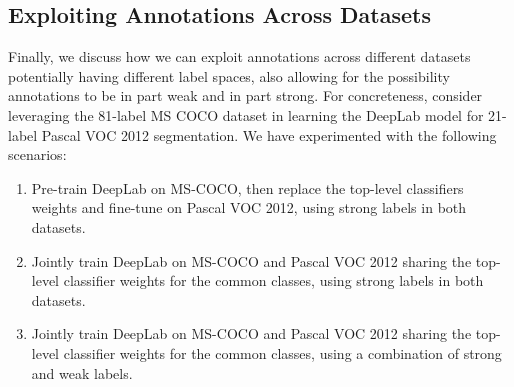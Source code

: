 \subsection{Exploiting Annotations Across Datasets}

Finally, we discuss how we can exploit annotations across different
datasets potentially having different label spaces, also allowing for
the possibility annotations to be in part weak and in part strong. For
concreteness, consider leveraging the 81-label MS COCO dataset in
learning the DeepLab model for 21-label Pascal VOC 2012
segmentation. We have experimented with the following scenarios:
\begin{enumerate}
\item Pre-train DeepLab on MS-COCO, then replace the top-level
  classifiers weights and fine-tune on Pascal VOC 2012, using strong
  labels in both datasets.
\item Jointly train DeepLab on MS-COCO and Pascal VOC 2012 sharing
  the top-level classifier weights for the common classes, using
  strong labels in both datasets.
\item Jointly train DeepLab on MS-COCO and Pascal VOC 2012 sharing
  the top-level classifier weights for the common classes, using a
  combination of strong and weak labels.
\end{enumerate}

